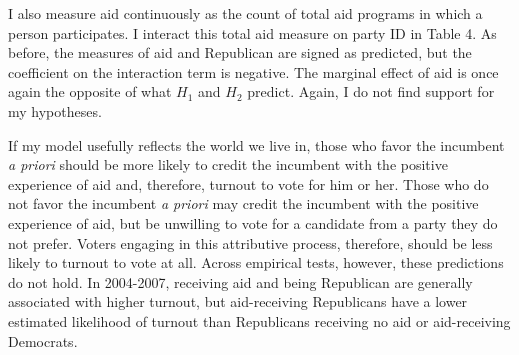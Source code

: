 \documentclass[12pt]{paper}
\begin{document}
I also measure aid continuously as the count of total aid programs in which a person participates. I interact this total aid measure on party ID in Table 4. As before, the measures of aid and Republican are signed as predicted, but the coefficient on the interaction term is negative. The marginal effect of aid is once again the opposite of what $H_1$ and $H_2$ predict. Again, I do not find support for my hypotheses.

If my model usefully reflects the world we live in, those who favor the incumbent \textit{a priori} should be more likely to credit the incumbent with the positive experience of aid and, therefore, turnout to vote for him or her. Those who do not favor the incumbent \textit{a priori} may credit the incumbent with the positive experience of aid, but be unwilling to vote for a candidate from a party they do not prefer. Voters engaging in this attributive process, therefore, should be less likely to turnout to vote at all. Across empirical tests, however, these predictions do not hold. In 2004-2007, receiving aid and being Republican are generally associated with higher turnout, but aid-receiving Republicans have a lower estimated likelihood of turnout than Republicans receiving no aid or aid-receiving Democrats.
\end{document}
